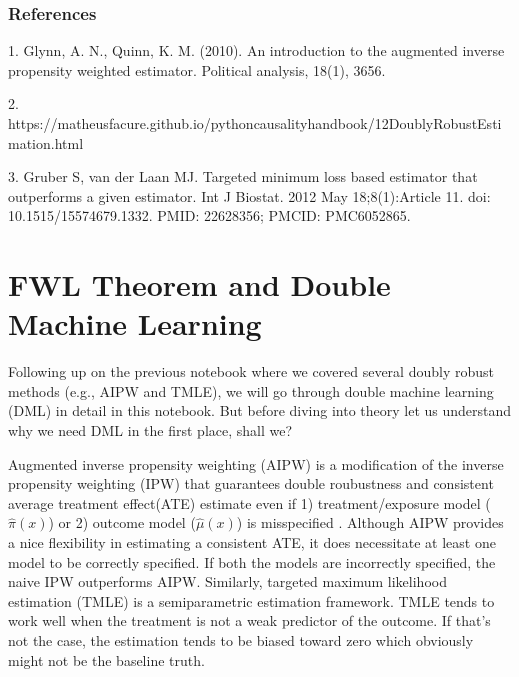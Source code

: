 \documentclass[letterpaper,10pt,english]{jupyterBook}
\begin{document}
\subsection{References}
\label{\detokenize{DR_Methods:references}}
\begin{sphinxVerbatim}[commandchars=\\\{\}]
1. Glynn, A. N., \PYGZam{} Quinn, K. M. (2010). An introduction to the augmented inverse propensity weighted estimator. Political analysis, 18(1), 36\PYGZhy{}56.

2. https://matheusfacure.github.io/python\PYGZhy{}causality\PYGZhy{}handbook/12\PYGZhy{}Doubly\PYGZhy{}Robust\PYGZhy{}Estimation.html

3. Gruber S, van der Laan MJ. Targeted minimum loss based estimator that outperforms a given estimator. Int J Biostat. 2012 May 18;8(1):Article 11. doi: 10.1515/1557\PYGZhy{}4679.1332. PMID: 22628356; PMCID: PMC6052865.
\end{sphinxVerbatim}

\sphinxstepscope


\chapter{FWL Theorem and Double Machine Learning}
\label{\detokenize{orthogonal_DML:fwl-theorem-and-double-machine-learning}}\label{\detokenize{orthogonal_DML::doc}}
\sphinxAtStartPar
Following up on the previous notebook where we covered several doubly robust methods (e.g., AIPW and TMLE), we will go through double machine learning (DML) in detail in this notebook. But before diving into theory let us understand why we need DML in the first place, shall we?

\sphinxAtStartPar
Augmented inverse propensity weighting (AIPW) is a modification of the inverse propensity weighting (IPW) that guarantees double roubustness and consistent average treatment effect(ATE) estimate even if 1) treatment/exposure model (\( \hat\pi(x) \)) or 2) outcome model (\( \hat\mu(x) \)) is misspecified . Although AIPW provides a nice flexibility in estimating a consistent ATE, it does necessitate at least one model to be correctly specified. If both the models are incorrectly specified, the naive IPW outperforms AIPW. Similarly, targeted maximum likelihood estimation (TMLE) is a semiparametric estimation framework. TMLE tends to work well when the treatment is not a weak predictor of the outcome. If that’s not the case, the estimation tends to be biased toward zero which obviously might not be the baseline truth.
\end{document}
